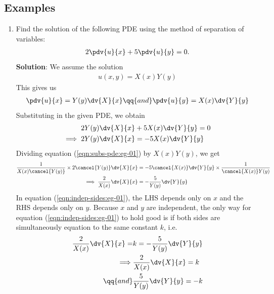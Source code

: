     \subsection{Examples}
        \begin{enumerate}
            \item Find the solution of the following PDE using the method of separation of variables:
            \begin{align*}
                2\pdv{u}{x}+5\pdv{u}{y}=0.
            \end{align*}
            \textbf{Solution}: \setcounter{equation}{0}
            We assume the solution
            \begin{align}
                u(x,y)=X(x)Y(y) \label{eqn:assumed-soln:eg-01}
            \end{align}
            This gives us
            \begin{align*}
                \pdv{u}{x}=Y(y)\dv{X}{x}\qq{and}\pdv{u}{y}=X(x)\dv{Y}{y}
            \end{align*}
            Substituting in the given PDE, we obtain
            \begin{align}
                2Y(y)\dv{X}{x}&+5X(x)\dv{Y}{y}=0 \nonumber\\
                \implies 2Y(y)\dv{X}{x}&=-5X(x)\dv{Y}{y} \label{eqn:subs-pde:eg-01}
            \end{align}
            Dividing equation (\ref{eqn:subs-pde:eg-01}) by $X(x)Y(y)$, we get
            \begin{align}
                \dfrac{1}{X(x)\cancel{Y(y)}}\times 2\cancel{Y(y)}\dv{X}{x}&=-5\cancel{X(x)}\dv{Y}{y}\times \dfrac{1}{\cancel{X(x)}Y(y)} \nonumber\\
                \implies\dfrac{2}{X(x)}\dv{X}{x}&=-\dfrac{5}{Y(y)}\dv{Y}{y} \label{eqn:indep-sides:eg-01}
            \end{align}
            In equation (\ref{eqn:indep-sides:eg-01}), the LHS depends only on $x$ and the RHS depends only on $y$. Because $x$ and $y$ are independent, the only way for equation (\ref{eqn:indep-sides:eg-01}) to hold good is if both sides are simultaneously equation to the same constant $k$, i.e.
            \begin{align}
                \dfrac{2}{X(x)}\dv{X}{x}=&k=-\dfrac{5}{Y(y)}\dv{Y}{y} \nonumber\\
                \implies &\dfrac{2}{X(x)}\dv{X}{x}=k \label{eqn:ode-X:eg-01}\\
                \qq{and} &\dfrac{5}{Y(y)}\dv{Y}{y}=-k \label{eqn:ode-Y:eg-01}
            \end{align}


\end{enumerate}

